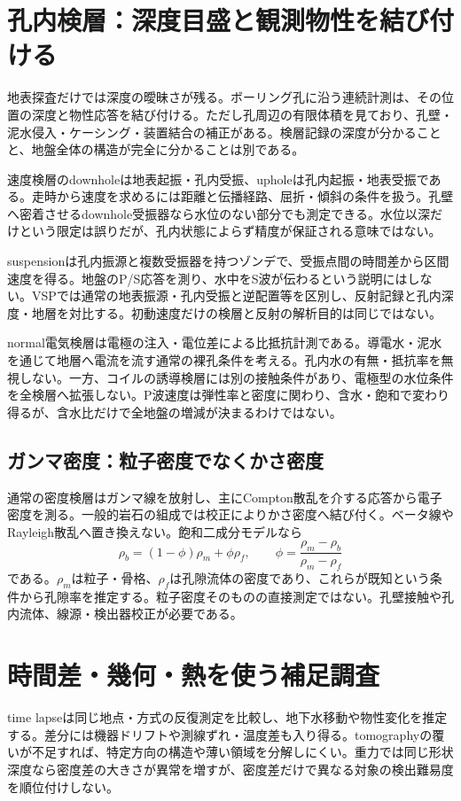 \section{孔内検層：深度目盛と観測物性を結び付ける}
\label{theory:exploration:borehole}
地表探査だけでは深度の曖昧さが残る。ボーリング孔に沿う連続計測は、その位置の深度と物性応答を結び付ける。ただし孔周辺の有限体積を見ており、孔壁・泥水侵入・ケーシング・装置結合の補正がある。検層記録の深度が分かることと、地盤全体の構造が完全に分かることは別である。

速度検層のdownholeは地表起振・孔内受振、upholeは孔内起振・地表受振である。走時から速度を求めるには距離と伝播経路、屈折・傾斜の条件を扱う。孔壁へ密着させるdownhole受振器なら水位のない部分でも測定できる\cite{geebec_ps}。水位以深だけという限定は誤りだが、孔内状態によらず精度が保証される意味ではない。

suspensionは孔内振源と複数受振器を持つゾンデで、受振点間の時間差から区間速度を得る\cite{oyo_suspension}。地盤のP/S応答を測り、水中をS波が伝わるという説明にはしない。VSPでは通常の地表振源・孔内受振と逆配置等を区別し、反射記録と孔内深度・地層を対比する。初動速度だけの検層と反射の解析目的は同じではない。

normal電気検層は電極の注入・電位差による比抵抗計測である。導電水・泥水を通じて地層へ電流を流す通常の裸孔条件を考える。孔内水の有無・抵抗率を無視しない。一方、コイルの誘導検層には別の接触条件があり、電極型の水位条件を全検層へ拡張しない。P波速度は弾性率と密度に関わり、含水・飽和で変わり得るが、含水比だけで全地盤の増減が決まるわけではない。

\subsection*{ガンマ密度：粒子密度でなくかさ密度}
\label{theory:exploration:gammadensity}
通常の密度検層はガンマ線を放射し、主にCompton散乱を介する応答から電子密度を測る。一般的岩石の組成では校正によりかさ密度へ結び付く。ベータ線やRayleigh散乱へ置き換えない。飽和二成分モデルなら
\[
 \rho_b=(1-\phi)\rho_m+\phi\rho_f,\qquad
 \phi=\frac{\rho_m-\rho_b}{\rho_m-\rho_f}
\]
である。\(\rho_m\)は粒子・骨格、\(\rho_f\)は孔隙流体の密度であり、これらが既知という条件から孔隙率を推定する。粒子密度そのものの直接測定ではない。孔壁接触や孔内流体、線源・検出器校正が必要である\cite{epa_gamma_density}。

\section{時間差・幾何・熱を使う補足調査}
\label{theory:exploration:multimethod}
time lapseは同じ地点・方式の反復測定を比較し、地下水移動や物性変化を推定する。差分には機器ドリフトや測線ずれ・温度差も入り得る。tomographyの覆いが不足すれば、特定方向の構造や薄い領域を分解しにくい。重力では同じ形状深度なら密度差の大きさが異常を増すが、密度差だけで異なる対象の検出難易度を順位付けしない。

